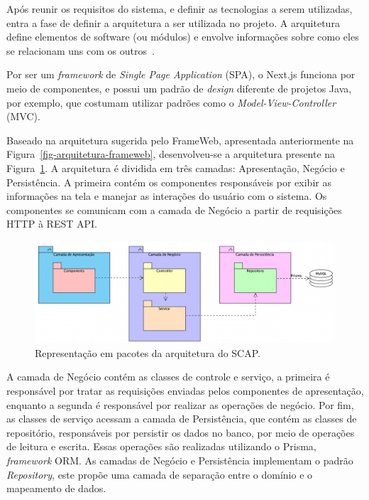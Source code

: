 Após reunir os requisitos do sistema, e definir as tecnologias a serem utilizadas, entra a fase 
de definir a arquitetura a ser utilizada no projeto. A arquitetura define elementos
de software (ou módulos) e envolve informações sobre como eles se relacionam uns com os outros~\cite{falbo:2018}.

Por ser um \textit{framework} de \textit{Single Page Application} (SPA), o Next.js funciona por meio de componentes,
e possui um padrão de \textit{design} diferente de projetos Java, por exemplo, que costumam utilizar
padrões como o \textit{Model-View-Controller} (MVC). 

Baseado na arquitetura sugerida pelo FrameWeb, apresentada anteriormente na Figura~\ref{fig-arquitetura-frameweb}, 
desenvolveu-se a arquitetura presente na Figura~\ref{fig-arquitetura}.
A arquitetura é dividida em três camadas: Apresentação, Negócio e Persistência.
A primeira contém os componentes responsáveis por exibir as informações na tela e manejar as interações do usuário
com o sistema. Os componentes se comunicam com a camada de Negócio a partir de requisições HTTP à REST API.

\begin{figure}[h!]
	\centering
	\includegraphics[width=\textwidth]{figuras/fig-arquitetura.png}
	\caption{Representação em pacotes da arquitetura do SCAP.}
	\label{fig-arquitetura}
\end{figure}

A camada de Negócio contém as classes de controle e serviço, a primeira é responsável por tratar as requisições
enviadas pelos componentes de apresentação, enquanto a segunda é responsável por realizar as operações de negócio.
Por fim, as classes de serviço acessam a camada de Persistência, que contém as classes de repositório, responsáveis por
persistir os dados no banco, por meio de operações de leitura e escrita. Essas operações são realizadas utilizando o Prisma,
\textit{framework} ORM. As camadas de Negócio e Persistência implementam o padrão \textit{Repository}, este propõe uma
camada de separação entre o domínio e o mapeamento de dados.


